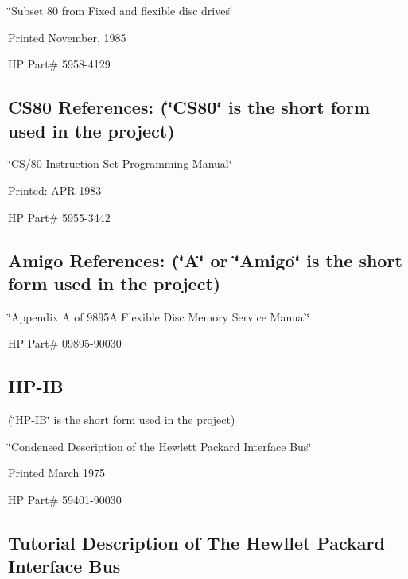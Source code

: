 \begin{DoxyItemize}
\item \char`\"{}\-Subset 80 from Fixed and flexible disc drives\char`\"{}
\item Printed November, 1985
\item H\-P Part\# 5958-\/4129
\end{DoxyItemize}

\subsection*{C\-S80 References\-: (\char`\"{}\-C\-S80\char`\"{} is the short form used in the project)}


\begin{DoxyItemize}
\item \char`\"{}\-C\-S/80 Instruction Set Programming Manual\char`\"{}
\item Printed\-: A\-P\-R 1983
\item H\-P Part\# 5955-\/3442
\end{DoxyItemize}

\subsection*{Amigo References\-: (\char`\"{}\-A\char`\"{} or \char`\"{}\-Amigo\char`\"{} is the short form used in the project)}


\begin{DoxyItemize}
\item \char`\"{}\-Appendix A of 9895\-A Flexible Disc Memory Service Manual\char`\"{}
\item H\-P Part\# 09895-\/90030
\end{DoxyItemize}

\subsection*{H\-P-\/\-I\-B}


\begin{DoxyItemize}
\item (\char`\"{}\-H\-P-\/\-I\-B\char`\"{} is the short form used in the project)
\item \char`\"{}\-Condensed Description of the Hewlett Packard Interface Bus\char`\"{}
\item Printed March 1975
\item H\-P Part\# 59401-\/90030
\end{DoxyItemize}

\subsection*{Tutorial Description of The Hewllet Packard Interface Bus}


